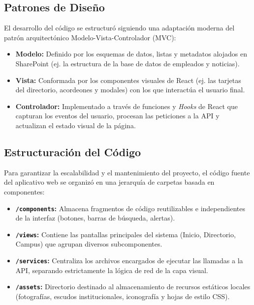 \subsection{Patrones de Diseño}
El desarrollo del código se estructuró siguiendo una adaptación moderna del patrón arquitectónico Modelo-Vista-Controlador (MVC):
\begin{itemize}
    \item \textbf{Modelo:} Definido por los esquemas de datos, listas y metadatos alojados en SharePoint (ej. la estructura de la base de datos de empleados y noticias).
    \item \textbf{Vista:} Conformada por los componentes visuales de React (ej. las tarjetas del directorio, acordeones y modales) con los que interactúa el usuario final.
    \item \textbf{Controlador:} Implementado a través de funciones y \textit{Hooks} de React que capturan los eventos del usuario, procesan las peticiones a la API y actualizan el estado visual de la página.
\end{itemize}

\subsection{Estructuración del Código}
Para garantizar la escalabilidad y el mantenimiento del proyecto, el código fuente del aplicativo web se organizó en una jerarquía de carpetas basada en componentes:
\begin{itemize}
    \item \textbf{\texttt{/components}:} Almacena fragmentos de código reutilizables e independientes de la interfaz (botones, barras de búsqueda, alertas).
    \item \textbf{\texttt{/views}:} Contiene las pantallas principales del sistema (Inicio, Directorio, Campus) que agrupan diversos subcomponentes.
    \item \textbf{\texttt{/services}:} Centraliza los archivos encargados de ejecutar las llamadas a la API, separando estrictamente la lógica de red de la capa visual.
    \item \textbf{\texttt{/assets}:} Directorio destinado al almacenamiento de recursos estáticos locales (fotografías, escudos institucionales, iconografía y hojas de estilo CSS).
\end{itemize}
